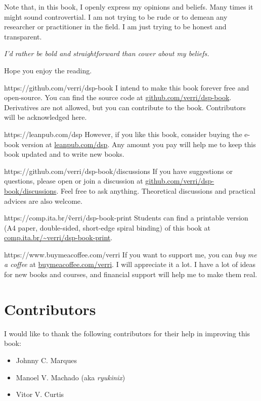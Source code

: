 Note that, in this book, I openly express my opinions and beliefs. Many times it might sound
controvertial.  I am not trying to be rude or to demean any researcher or practitioner in the
field.  I am just trying to be honest and transparent.

\vspace{1em}
\emph{I'd rather be bold and straightforward than cower about my beliefs.}
\vspace{1em}

Hope you enjoy the reading.

\newpage

\begin{parwithqr}{https://github.com/verri/dsp-book}
  I intend to make this book forever free and open-source.  You can find the source code at
  \href{\aurl}{github.com/verri/dsp-book}.  Derivatives are not allowed, but you can
  contribute to the book.  Contributors will be acknowledged here.
\end{parwithqr}

\vfill

\begin{lparwithqr}{https://leanpub.com/dsp}
  However, if you like this book, consider buying the e-book version at
  \href{\aurl}{leanpub.com/dsp}.  Any amount you pay will help me to keep this book
  updated and to write new books.
\end{lparwithqr}

\vfill

\begin{parwithqr}{https://github.com/verri/dsp-book/discussions}
  If you have suggestions or questions, please open or join a discussion at
  \href{\aurl}{github.com/verri/dsp-book/discussions}.  Feel free to ask anything.
  Theoretical discussions and practical advices are also welcome.
\end{parwithqr}

\vfill

\begin{lparwithqr}{https://comp.ita.br/\~verri/dsp-book-print}
  Students can find a printable version (A4 paper, double-sided, short-edge spiral
  binding) of this book at \href{\aurl}{comp.ita.br/\textasciitilde{}verri/dsp-book-print}.
\end{lparwithqr}

\vfill

\begin{parwithqr}{https://www.buymeacoffee.com/verri}
  If you want to support me, you can \emph{buy me a coffee} at
  \href{\aurl}{buymeacoffee.com/verri}.  I will appreciate it a lot.
  I have a lot of ideas for new books and courses, and financial support will help me to
  make them real.
\end{parwithqr}

\newpage

\section*{Contributors}

I would like to thank the following contributors for their help in improving this book:

\begin{itemize}
  \itemsep0em
  \item Johnny C. Marques
  \item Manoel V. Machado (aka \emph{ryukinix})
  \item Vitor V. Curtis
\end{itemize}
